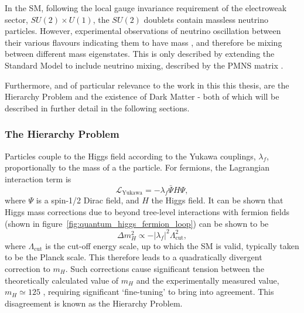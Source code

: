In the SM, following the local gauge invariance requirement of the electroweak
sector, $SU(2)\times U(1)$, the $SU(2)$ doublets contain
massless neutrino particles. However, experimental observations of neutrino
oscillation between their various flavours indicating them to have mass
\cite{PhysRevLett.81.1562,PhysRevLett.89.011302}, and
therefore be mixing between different mass eigenstates. This is only described
by extending the Standard Model to include neutrino mixing, described by the
PMNS matrix \cite{Altarelli:2002hx}.

Furthermore, and of particular relevance to the work in this this thesis, are
the Hierarchy Problem and the existence of Dark Matter - both of which will be
described in further detail in the following sections.

\subsubsection{The Hierarchy Problem}


Particles couple to the Higgs field according to the Yukawa couplings,
$\lambda_f$,
proportionally to the mass of a the particle. For fermions, the Lagrangian
interaction term is
% 
\begin{equation}
\mathcal{L}_\text{Yukawa} = - \lambda_f \bar{\Psi}H\Psi,
\end{equation}
% 
where $\Psi$ is a spin-1/2 Dirac field, and $H$ the Higgs field. It can be shown
that Higgs mass corrections due to beyond tree-level interactions with fermion
fields (shown in figure~\ref{fig:quantum_higgs_fermion_loop}) can be shown to be
% 
\begin{equation}
\Delta m_H^2 \propto -|\lambda_f|^2 \Lambda_{\text{cut}}^2,
\label{eq:higgs_corr_hierarchy}
\end{equation}
% 
where $\Lambda_{\text{cut}}$ is the cut-off energy scale, up to which the SM is
valid, typically taken to be the Planck scale. This therefore leads to a
quadratically
divergent correction to $m_H$. Such corrections cause significant tension
between the theoretically calculated value of $m_H$ and the experimentally
measured value, $m_H \simeq 125$ \gev \cite{Chatrchyan:2012ufa, Aad:2012tfa},
requiring significant `fine-tuning' to bring into agreement. This disagreement
is known as the Hierarchy Problem.

